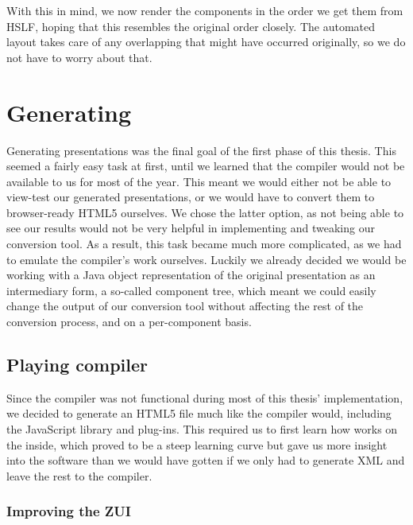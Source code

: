     With this in mind, we now render the components in the order we get them
    from HSLF, hoping that this resembles the original order closely. The
    automated layout takes care of any overlapping that might have occurred
    originally, so we do not have to worry about that.

  \section{Generating \mxp}

   Generating \mxp presentations was the final goal of the first phase of this
   thesis. This seemed a fairly easy task at first, until we learned that the
   \mxp compiler would not be available to us for most of the year. This meant
   we would either not be able to view-test our generated presentations, or we
   would have to convert them to browser-ready HTML5 ourselves. We chose the
   latter option, as not being able to see our results would not be very
   helpful in implementing and tweaking our conversion tool. As a result, this
   task became much more complicated, as we had to emulate the compiler's work
   ourselves. Luckily we already decided we would be working with a Java object
   representation of the original presentation as an intermediary form, a
   so-called component tree, which meant we could easily change the output of
   our conversion tool without affecting the rest of the conversion process,
   and on a per-component basis.


   \subsection{Playing \mxp compiler}

    Since the \mxp compiler was not functional during most of this thesis'
    implementation, we decided to generate an HTML5 file much like the \mxp
    compiler would, including the \mxp JavaScript library and plug-ins. This
    required us to first learn how \mxp works on the inside, which proved to be
    a steep learning curve but gave us more insight into the software than we
    would have gotten if we only had to generate \mxp XML and leave the rest to
    the compiler.

    \subsubsection{Improving the ZUI}
   
